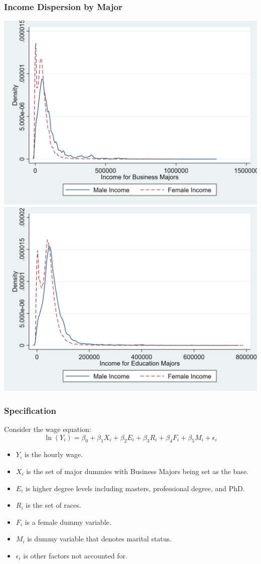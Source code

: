 \documentclass[12pt]{beamer}
\begin{document}
\begin{frame}
\frametitle{Income Dispersion by Major}
\begin{center}
\includegraphics[scale=0.1395]{business.png}
\includegraphics[scale=0.1395]{education.png}
\end{center}
\end{frame}

\begin{frame}
\frametitle{Specification}
Consider the wage equation:
\begin{equation}
\ln(Y_i) = \beta_0 + \beta_1 X_i + \beta_2 E_i + \beta_3 R_i + \beta_4 F_i + \beta_5 M_i + \epsilon_i
\end{equation}
\begin{itemize}
\item $Y_i$ is the hourly wage.
\item $X_i$ is the set of major dummies with Business Majors being set as the base.
\item $E_i$ is higher degree levels including masters, professional degree, and PhD.
\item $R_i$ is the set of races.
\item $F_i$ is a female dummy variable.
\item $M_i$ is dummy variable that denotes marital status.
\item $\epsilon_i$ is other factors not accounted for.
\end{itemize}
\end{frame}
\end{document}

